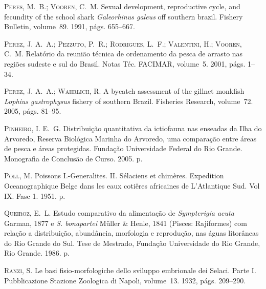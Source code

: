\documentclass[a4paper,11pt,twoside,showtrims,onecolumn,openright,final]{memoir}
\begin{document}
\begin{thebibliography}{194}
\textsc{Peres, M.~B.; Vooren, C.~M.}
\newblock Sexual development, reproductive cycle, and fecundity of the school
  shark \emph{{G}aleorhinus galeus} off southern brazil.
\newblock Fishery Bulletin, volume~89. 1991, p\'ags. 655--667.

\textsc{Perez, J. A.~A.; Pezzuto, P.~R.; Rodrigues, L.~F.; Valentini, H.;
  Vooren, C.~M.}
\newblock Relat\'orio da reuni\~ao t\'ecnica de ordenamento da pesca de arrasto
  nas regi\~oes sudeste e sul do {B}rasil.
\newblock Notas T\'ec. FACIMAR, volume~5. 2001, p\'ags. 1--34.

\textsc{Perez, J. A.~A.; Wahrlich, R.}
\newblock A bycatch assessment of the gillnet monkfish \emph{{L}ophius gastrophysus}
  fishery of southern {B}razil.
\newblock Fisheries Research, volume~72. 2005, p\'ags. 81--95.

\textsc{Pinheiro, I. E.~G.}
\newblock Distribui\c{c}\~ao quantitativa da ictiofauna nas enseadas da {I}lha
  do {A}rvoredo, {R}eserva {B}iol\'ogica {M}arinha do {A}rvoredo, uma
  compara\c{c}\~ao entre \'areas de pesca e \'areas protegidas.
\newblock Funda\c{c}\~ao Universidade Federal do Rio Grande. Monografia de
  Conclus\~ao de Curso. 2005.
 p.

\textsc{Poll, M.}
\newblock Poissons {I}.-{G}eneralites. {II}. {S}\'elaciens et chim\`eres.
\newblock Expedition Oceanographique Belge dans les eaux coti\^eres africaines
  de L'Atlantique Sud. Vol IX. Fasc 1. 1951.
 p.

\textsc{Queiroz, E.~L.}
\newblock Estudo comparativo da alimenta\c{c}\~ao de \emph{{S}ympterigia acuta}
  {G}arman, 1877 e \emph{{S}. bonapartei} {M}\"uller \& {H}enle, 1841 ({P}isces:
  {R}ajiformes) com rela\c{c}\~ao a distribui\c{c}\~ao, abund\^ancia,
  morfologia e reprodu\c{c}\~ao, nas \'aguas litor\^aneas do {R}io {G}rande do
  {S}ul.
\newblock Tese de Mestrado, Funda\c{c}\~ao Universidade do Rio Grande, Rio
  Grande. 1986.
 p.

\textsc{Ranzi, S.}
\newblock Le basi fisio-morfologiche dello sviluppo embrionale dei {S}elaci.
  {P}arte {I}.
\newblock Pubblicazione Stazione Zoologica di Napoli, volume~13. 1932, p\'ags.
  209--290.


\end{thebibliography}
\end{document}
